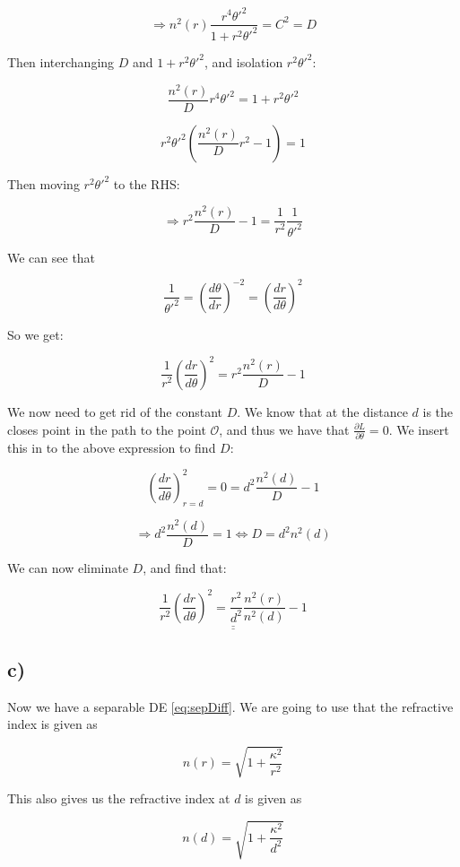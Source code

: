 \documentclass[a4paper,norsk, 10pt]{article}
\begin{document}
$$
\Rightarrow n^2(r)\frac{r^4 \theta'^2}{1+r^2\theta'^2} = C^2 = D
$$

Then interchanging $D$ and $1+r^2\theta'^2$, and isolation $r^2\theta'^2$:

$$
\frac{n^2(r)}{D}r^4\theta'^2 = 1 + r^2\theta'^2
$$

$$
r^2\theta'^2\left(\frac{n^2(r)}{D}r^2 - 1\right) = 1
$$

Then moving $r^2\theta'^2$ to the RHS:

$$
\Rightarrow r^2\frac{n^2(r)}{D} - 1 = \frac{1}{r^2}\frac{1}{\theta'^2}
$$

We can see that 

$$
\frac{1}{\theta'^2} = \left(\frac{d\theta}{dr}\right)^{-2} = \left(\frac{dr}{d\theta}\right)^2
$$

So we get:

$$
\frac{1}{r^2}\left(\frac{dr}{d\theta}\right)^2 = r^2\frac{n^2(r)}{D} -1
$$

We now need to get rid of the constant $D$. We know that at the distance $d$ is the closes point in the path to the point $\mathcal{O}$, and thus we have that $\frac{\partial L}{\partial \theta} = 0$. We insert this in to the above expression to find $D$:


$$
\left(\frac{dr}{d\theta}\right)^2_{r = d} = 0 = d^2\frac{n^2(d)}{D} -1
$$

$$
\Rightarrow d^2\frac{n^2(d)}{D} = 1 \Leftrightarrow D = d^2 n^2(d)
$$

We can now eliminate $D$, and find that:

\begin{equation}
\underline{\underline{\frac{1}{r^2}\left(\frac{dr}{d\theta}\right)^2 = \frac{r^2}{d^2}\frac{n^2(r)}{n^2(d)} -1}}
\label{eq:sepDiff}
\end{equation}


\subsection*{c)}

Now we have a separable DE \ref{eq:sepDiff}. We are going to use that the refractive index is given as 

\begin{equation}
n(r) = \sqrt{1 + \frac{\kappa^2}{r^2}}
\label{eq:refIndex}
\end{equation}

This also gives us the refractive index at $d$ is given as

$$
n(d) = \sqrt{1 + \frac{\kappa^2}{d^2}}
$$
\end{document}
